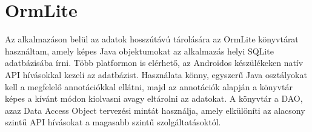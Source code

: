 \section*{OrmLite}
\label{ormlite}

Az alkalmazáson belül az adatok hosszútávú tárolására az OrmLite könyvtárat \cite{ormlite} használtam, amely képes Java objektumokat az alkalmazás helyi SQLite adatbázisába írni. 
Több platformon is elérhető, az Androidos készülékeken natív API hívásokkal kezeli az adatbázist. 
Használata könny, egyszerű Java osztályokat kell a megfelelő annotációkkal ellátni, majd az annotációk alapján a könyvtár képes a kívánt módon kiolvasni avagy eltárolni az adatokat. 
A könyvtár a DAO, azaz Data Access Object tervezési mintát használja, amely elkülöníti az alacsony szintű API hívásokat a magasabb szintű szolgáltatásoktól. 
